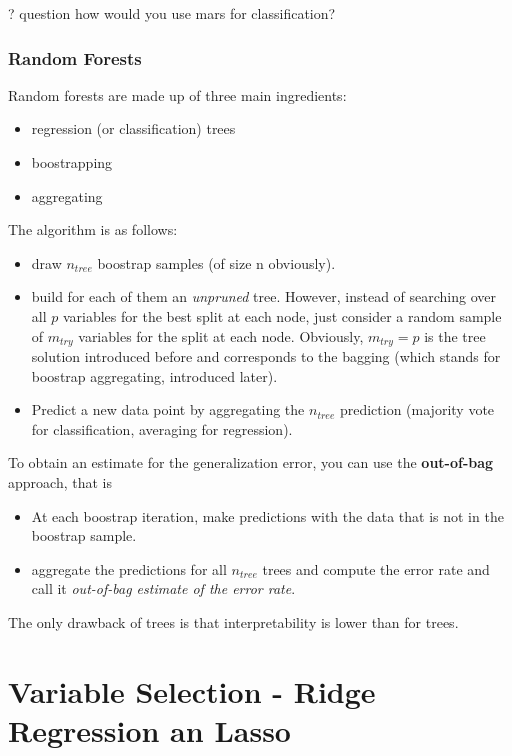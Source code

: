 \documentclass[]{book}
\providecommand{\tightlist}{%
  \setlength{\itemsep}{0pt}\setlength{\parskip}{0pt}}
\begin{document}
? question how would you use mars for classification?

\subsection{Random Forests}\label{random-forests}

Random forests are made up of three main ingredients:

\begin{itemize}
\tightlist
\item
  regression (or classification) trees
\item
  boostrapping
\item
  aggregating
\end{itemize}

The algorithm is as follows:

\begin{itemize}
\tightlist
\item
  draw \(n_{tree}\) boostrap samples (of size n obviously).
\item
  build for each of them an \emph{unpruned} tree. However, instead of
  searching over all \(p\) variables for the best split at each node,
  just consider a random sample of \(m_{try}\) variables for the split
  at each node. Obviously, \(m_{try} = p\) is the tree solution
  introduced before and corresponds to the bagging (which stands for
  boostrap aggregating, introduced later).
\item
  Predict a new data point by aggregating the \(n_{tree}\) prediction
  (majority vote for classification, averaging for regression).
\end{itemize}

To obtain an estimate for the generalization error, you can use the
\textbf{out-of-bag} approach, that is

\begin{itemize}
\tightlist
\item
  At each boostrap iteration, make predictions with the data that is not
  in the boostrap sample.
\item
  aggregate the predictions for all \(n_{tree}\) trees and compute the
  error rate and call it \emph{out-of-bag estimate of the error rate}.
\end{itemize}

The only drawback of trees is that interpretability is lower than for
trees.

\chapter{Variable Selection - Ridge Regression an
Lasso}\label{variable-selection---ridge-regression-an-lasso}
\end{document}
